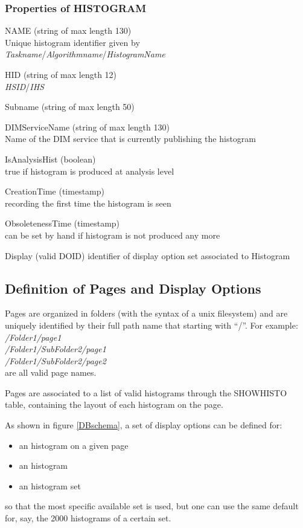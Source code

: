 \documentclass{lhcbnote}
\begin{document}
\subsubsection{Properties of HISTOGRAM}
\begin{description}
\item{NAME} (string of max length 130)\\
Unique histogram identifier given by\\
 {\it Taskname}/{\it Algorithmname}/{\it HistogramName}
\item{HID} (string of max length 12)\\
{\it HSID}/{\it IHS}
\item{Subname} (string of max length 50)
\item{DIMServiceName} (string of max length 130)\\
Name of the DIM service that is currently publishing the histogram 
\item{IsAnalysisHist} (boolean)\\
true if histogram is produced at analysis level
\item{CreationTime} (timestamp)\\
recording the first time the histogram is seen
\item{ObsoletenessTime} (timestamp)\\
can be set by hand if histogram is not produced any more 
\item{Display} (valid DOID)
identifier of display option set associated to Histogram 
\end{description}

\subsection{Definition of Pages and Display Options}
Pages are organized in folders (with the syntax of a unix filesystem)
and are uniquely identified by their full path name that starting with
``/''. For example:\\
{\it /Folder1/page1}\\
{\it /Folder1/SubFolder2/page1}\\
{\it /Folder1/SubFolder2/page2}\\
are all valid page names.

Pages are associated to a list of valid histograms through the SHOWHISTO
table, containing the layout of each histogram on the page.

As shown in figure \ref{DBschema}, a set of display options can
be defined for:
\begin{itemize}
\item an histogram on a given page
\item an histogram
\item an histogram set
\end{itemize}
so that the most specific available set is used, but one can use the
same default for, say, the 2000 histograms of a certain set. 
\end{document}
